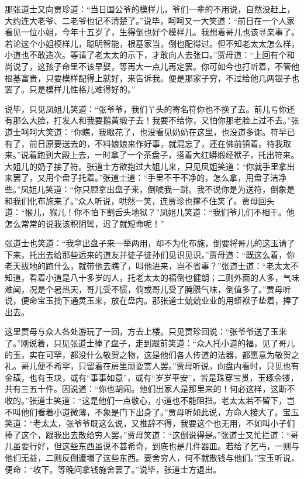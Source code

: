 \documentclass[12pt,oneside]{book}
\begin{document}
那张道士又向贾珍道：“当日国公爷的模样儿，爷们一辈的不用说，自然没赶上，大约连大老爷、二老爷也记不清楚了。”说毕，呵呵又一大笑道：“前日在一个人家看见一位小姐，今年十五岁了，生得倒也好个模样儿。我想着哥儿也该寻亲事了。若论这个小姐模样儿，聪明智能，根基家当，倒也配得过。但不知老太太怎么样，小道也不敢造次。等请了老太太的示下，才敢向人去张口。”贾母道：“上回有个和尚说了，这孩子命里不该早娶，等再大一点儿再定罢。你可如今也打听着，不管他根基富贵，只要模样配得上就好，来告诉我。便是那家子穷，不过给他几两银子也罢了。只是模样儿性格儿难得好的。”

说毕，只见凤姐儿笑道：“张爷爷，我们丫头的寄名符你也不换了去。前儿亏你还有那么大脸，打发人和我要鹅黄缎子去！我要不给你，又怕你那老脸上过不去。”张道士呵呵大笑道：“你瞧，我眼花了，也没看见奶奶在这里，也没道多谢。符早已有了，前日原要送去的，不料娘娘来作好事，就混忘了，还在佛前镇着。待我取来。”说着跑到大殿上去，一时拿了一个茶盘子，搭着大红蟒缎经袱子，托出符来。大姐儿的奶子接了符。张道士方欲抱过大姐儿来，只见凤姐笑道：“你就手里拿出来罢了，又用个盘子托着。”张道士道：“手里不干不净的，怎么拿，用盘子洁净些。”凤姐儿笑道：“你只顾拿出盘子来，倒唬我一跳。我不说你是为送符，倒象是和我们化布施来了。”众人听说，哄然一笑，连贾珍也撑不住笑了。贾母回头道：“猴儿，猴儿！你不怕下割舌头地狱？”凤姐儿笑道：“我们爷儿们不相干。他怎么常常的说我该积阴骘，迟了就短命呢！”

张道士也笑道：“我拿出盘子来一举两用，却不为化布施，倒要将哥儿的这玉请了下来，托出去给那些远来的道友并徒子徒孙们见识见识。”贾母道：“既这么着，你老天拔地的跑什么，就带他去瞧了，叫他进来，岂不省事？”张道士道：“老太太不知道，看着小道是八十多岁的人，托老太太的福倒也健朗；二则外面的人多，气味难闻，况是个暑热天，哥儿受不惯，倘或哥儿受了腌臜气味，倒值多了。”贾母听说，便命宝玉摘下通灵玉来，放在盘内。那张道士兢兢业业的用蟒袱子垫着，捧了出去。

这里贾母与众人各处游玩了一回，方去上楼。只见贾珍回说：“张爷爷送了玉来了。”刚说着，只见张道士捧了盘子，走到跟前笑道：“众人托小道的福，见了哥儿的玉，实在可罕，都没什么敬贺之物，这是他们各人传道的法器，都愿意为敬贺之礼。哥儿便不希罕，只留着在房里顽耍赏人罢。”贾母听说，向盘内看时，只见也有金璜，也有玉玦，或有“事事如意”，或有“岁岁平安”，皆是珠穿宝贯，玉琢金镂，共有三五十件。因说道：“你也胡闹。他们出家人是那里来的！何必这样，这断不收的。”张道士笑道：“这是他们一点敬心，小道也不能阻挡。老太太若不留下，岂不叫他们看着小道微薄，不象是门下出身了。”贾母听如此说，方命人接大了。宝玉笑道：“老太太，张爷爷既这么说，又推辞不得，我要这个也无用，不如叫小子们捧了这个，跟我出去散给穷人罢。”贾母笑道：“这倒说得是。”张道士又忙拦道：“哥儿虽要行好，但这些东西虽说不甚希奇，到底也是几件器皿。若给了乞丐，一则与他们无益，二则反倒遭塌了这些东西。要舍穷人，何不就散钱与他们。”宝玉听说，便命：“收下。等晚间拿钱施舍罢了。”说毕，张道士方退出。
\end{document}
